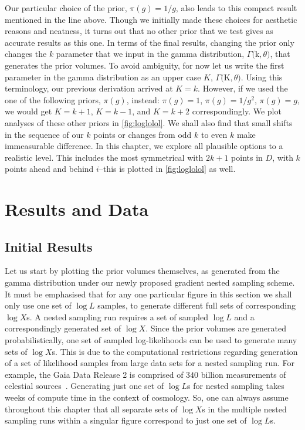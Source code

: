 Our particular choice of the prior, $\pi (g)=1/g$, also leads to this compact result mentioned in the line above. Though we initially made these choices for aesthetic reasons and neatness, it turns out that no other prior that we test gives as accurate results as this one.  In terms of the final results, changing the prior only changes the $k$ parameter that we input in the gamma distribution, $\Gamma ($k$,\theta)$, that generates the prior volumes. To avoid ambiguity, for now let us write the first parameter in the gamma distribution as an upper case $K$, $\Gamma ($K$,\theta)$. Using this terminology, our previous derivation arrived at $K=k$. However, if we used the one of the following priors, $\pi (g)$, instead: $\pi (g)=1$, $\pi (g)=1/g^2$, $\pi (g)=g$, we would get $K=k+1$, $K=k-1$, and $K=k+2$ correspondingly. We plot analyses of these other priors in \cref{fig:loglolol}. We shall also find that small shifts in the sequence of our $k$ points or changes from odd $k$ to even $k$ make immeasurable difference. In this chapter, we explore all plausible options to a realistic level. This includes the most symmetrical  with $2k+1$ points in $D$, with $k$ points ahead and behind $i$--this is plotted in \cref{fig:loglolol} as well.



\section{Results and Data} \label{sec:resdat}

\subsection{Initial Results}

Let us start by plotting the prior volumes themselves, as generated from the gamma distribution under our newly proposed gradient nested sampling scheme. It must be emphasised that for any one particular figure in this section we shall only use one set of $\log L$ samples, to generate different full sets of corresponding $\log X$s. A nested sampling run requires a set of sampled $\log L$ and a correspondingly generated set of $\log X$. Since the prior volumes are generated probabilistically, one set of sampled log-likelihoods can be used to generate many sets of $\log X$s. This is due to the computational restrictions regarding generation of a set of likelihood samples from large data sets for a nested sampling run. For example, the Gaia Data Release 2 is comprised of $340$ billion measurements of celestial sources~\cite{gaia_in_the_uk}. Generating just one set of $\log L$s for nested sampling takes weeks of compute time in the context of cosmology. So, one can always assume throughout this chapter that all separate sets of $\log X$s in the multiple nested sampling runs within a singular figure correspond to just one set of $\log L$s. 

